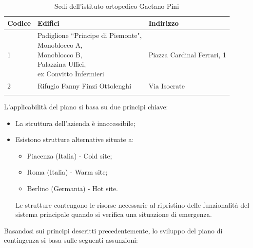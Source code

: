 \documentclass[12pt, a4paper, titlepage]{report}
\begin{document}
		\begin{longtable}{| p{1.5cm} | p{8cm} | p{6cm} |}
			\hline
			\textbf{Codice} & \textbf{Edifici} & \textbf{Indirizzo} \\ \hline
			1 & \makecell[l]{Padiglione ``Principe di Piemonte",\\ Monoblocco A,\\ Monoblocco B,\\ Palazzina Uffici,\\ ex Convitto Infermieri} & Piazza Cardinal Ferrari, 1 \\ \hline
			2 & Rifugio Fanny Finzi Ottolenghi & Via Isocrate \\ \hline 
			\caption{Sedi dell'istituto ortopedico Gaetano Pini}
		\end{longtable}
		L'applicabilità del piano si basa su due principi chiave:
		\begin{itemize}
			\item La struttura dell'azienda è inaccessibile;
			\item Esistono strutture alternative situate a:
				\begin{itemize}
					\item Piacenza (Italia) - Cold site;
					\item Roma (Italia) - Warm site;
					\item Berlino (Germania) - Hot site.
				\end{itemize}
				Le strutture contengono le risorse necessarie al ripristino delle funzionalità del sistema principale quando si verifica una situazione di emergenza.
		\end{itemize}
		Basandosi sui principi descritti precedentemente, lo sviluppo del piano di contingenza si basa sulle seguenti assunzioni:
\end{document}
